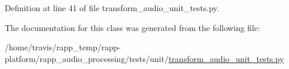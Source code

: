 Definition at line 41 of file transform\-\_\-audio\-\_\-unit\-\_\-tests.\-py.



The documentation for this class was generated from the following file\-:\begin{DoxyCompactItemize}
\item 
/home/travis/rapp\-\_\-temp/rapp-\/platform/rapp\-\_\-audio\-\_\-processing/tests/unit/\hyperlink{transform__audio__unit__tests_8py}{transform\-\_\-audio\-\_\-unit\-\_\-tests.\-py}\end{DoxyCompactItemize}
